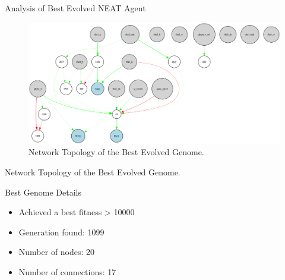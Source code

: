 \documentclass{beamer}
\begin{document}
\begin{frame}{Analysis of Best Evolved NEAT Agent}
      \centering
      \begin{figure}
          \centering
          \includegraphics[width=0.75\linewidth]{media/best_genome_network.png} %
          \caption{Network Topology of the Best Evolved Genome.}
      \end{figure}
      \tiny Network Topology of the Best Evolved Genome.
      \begin{block}{\tiny Best Genome Details}
          \begin{itemize}
              \item Achieved a best fitness > 10000
              \item Generation found: 1099
              \item Number of nodes: 20
              \item Number of connections: 17
          \end{itemize}
      \end{block}
\end{frame}
\end{document}

